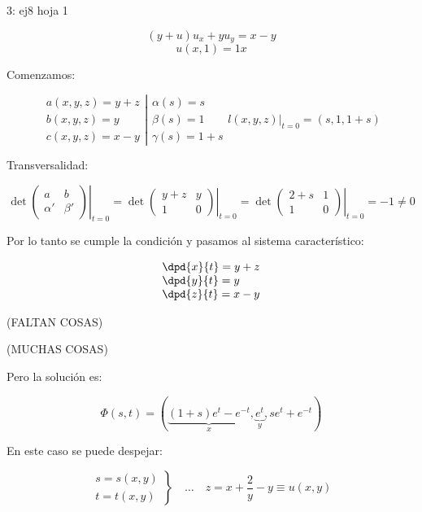 	\begin{example}{3: ej8 hoja 1}

		\[ (y+u)u_x + y u_y = x-y \]
		\[u(x,1) = 1  x \]

		Comenzamos:

		\[ \left. \begin{array}{r}
		a(x,y,z) = y+z \\
		b(x,y,z) = y \\
		c(x,y,z) = x-y
		\end{array} \right| \begin{array}{l}
		\alpha(s) = s \\
		\beta(s) = 1 \\
		\gamma(s) = 1+s \end{array}{l}
		(x,y,z)|_{t=0} = (s,1,1+s)
		\]

		Transversalidad:

		\[ \det \left.\begin{pmatrix}
		a  & b \\
		\alpha' & \beta' \end{pmatrix}\right|_{t=0} =
		\det \left.\begin{pmatrix}
		y+z  & y \\
		1 & 0 \end{pmatrix} \right|_{t=0} =
		\det \left.\begin{pmatrix}
		2+s  & 1 \\
		1 & 0 \end{pmatrix} \right|_{t=0} = -1 \neq 0 \]

		Por lo tanto se cumple la condición y pasamos al sistema característico:

		\[
		\begin{array}{l}
			 \dpd{x}{t} = y+z  \\
			 \dpd{y}{t} = y \\
			 \dpd{z}{t} = x-y
		\end{array}
		\]



		(FALTAN COSAS)

		(MUCHAS COSAS)

		Pero la solución es:

		\[ \Phi(s,t) = (\underbrace{(1+s)e^t-e^{-t}}_{x},\underbrace{e^t}_{y}, se^t + e^{-t}) \]

		En este caso se puede despejar:

		\[  \left. \begin{array}{r}
		s = s(x,y) \\
		t = t(x,y)
		\end{array}
		\right\}\quad … \quad z = x + \frac{2}{y} - y \equiv u(x,y)
		\]


\end{example}

